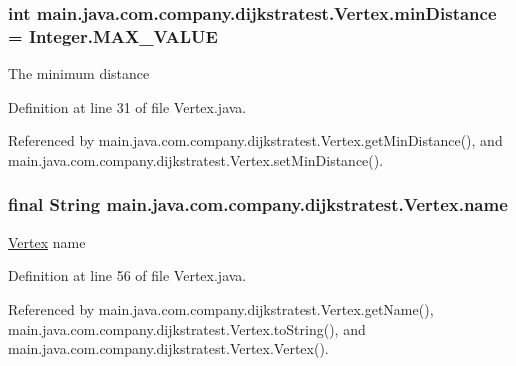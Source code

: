 \hypertarget{classmain_1_1java_1_1com_1_1company_1_1dijkstratest_1_1_vertex_a4ea46fdc17ccba35d2a35e4b70bff997}{
\subsubsection[{min\-Distance}]{\setlength{\rightskip}{0pt plus 5cm}int main.\-java.\-com.\-company.\-dijkstratest.\-Vertex.\-min\-Distance = Integer.\-M\-A\-X\-\_\-\-V\-A\-L\-U\-E\hspace{0.3cm}{\ttfamily [private]}}}\label{classmain_1_1java_1_1com_1_1company_1_1dijkstratest_1_1_vertex_a4ea46fdc17ccba35d2a35e4b70bff997}
The minimum distance 

Definition at line 31 of file Vertex.\-java.



Referenced by main.\-java.\-com.\-company.\-dijkstratest.\-Vertex.\-get\-Min\-Distance(), and main.\-java.\-com.\-company.\-dijkstratest.\-Vertex.\-set\-Min\-Distance().

\hypertarget{classmain_1_1java_1_1com_1_1company_1_1dijkstratest_1_1_vertex_a2d3af47cee45105338487ebabe5d41af}{
\subsubsection[{name}]{\setlength{\rightskip}{0pt plus 5cm}final String main.\-java.\-com.\-company.\-dijkstratest.\-Vertex.\-name\hspace{0.3cm}{\ttfamily [private]}}}\label{classmain_1_1java_1_1com_1_1company_1_1dijkstratest_1_1_vertex_a2d3af47cee45105338487ebabe5d41af}
\hyperlink{classmain_1_1java_1_1com_1_1company_1_1dijkstratest_1_1_vertex}{Vertex} name 

Definition at line 56 of file Vertex.\-java.



Referenced by main.\-java.\-com.\-company.\-dijkstratest.\-Vertex.\-get\-Name(), main.\-java.\-com.\-company.\-dijkstratest.\-Vertex.\-to\-String(), and main.\-java.\-com.\-company.\-dijkstratest.\-Vertex.\-Vertex().

